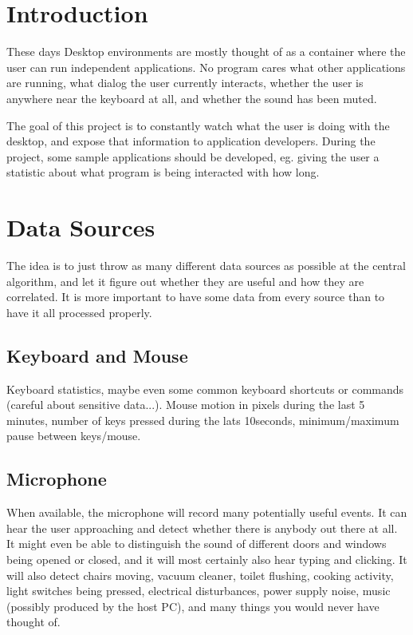 \documentclass[]{article}
\begin{document}
\maketitle

\section{Introduction}

These days Desktop environments are mostly thought of as a container
where the user can run independent applications. No program cares what
other applications are running, what dialog the user currently
interacts, whether the user is anywhere near the keyboard at all, and
whether the sound has been muted.

The goal of this project is to constantly watch what the user is doing
with the desktop, and expose that information to application
developers. During the project, some sample applications should be
developed, eg. giving the user a statistic about what program is being
interacted with how long.

\section{Data Sources}

The idea is to just throw as many different data sources as possible
at the central algorithm, and let it figure out whether they are
useful and how they are correlated. It is more important to have some
data from every source than to have it all processed properly.

\subsection{Keyboard and Mouse}

Keyboard statistics, maybe even some common keyboard shortcuts or
commands (careful about sensitive data...). Mouse motion in pixels
during the last 5 minutes, number of keys pressed during the lats
10seconds, minimum/maximum pause between keys/mouse.

\subsection{Microphone}
When available, the microphone will record many potentially useful
events. It can hear the user approaching and detect whether there is
anybody out there at all. It might even be able to distinguish the
sound of different doors and windows being opened or closed, and it
will most certainly also hear typing and clicking. It will also detect
chairs moving, vacuum cleaner, toilet flushing, cooking activity,
light switches being pressed, electrical disturbances, power supply
noise, music (possibly produced by the host PC), and many things you
would never have thought of.
\end{document}
